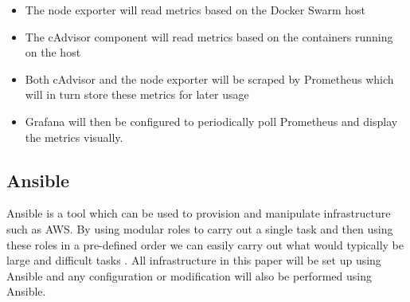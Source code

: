 \begin{itemize}
	\item The node exporter will read metrics based on the Docker Swarm host
	\item The cAdvisor component will read metrics based on the containers running on the host
	\item Both cAdvisor and the node exporter will be scraped by Prometheus which will in turn store these metrics for later usage
	\item Grafana will then be configured to periodically poll Prometheus and display the metrics visually.
\end{itemize}

\subsection{Ansible}
Ansible is a tool which can be used to provision and manipulate infrastructure such as AWS. By using modular roles to carry out a single task and then using these roles in a pre-defined order we can easily carry out what would typically be large and difficult tasks \citep{Ansible2017}. All infrastructure in this paper will be set up using Ansible and any configuration or modification will also be performed using Ansible.
